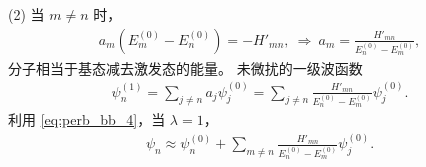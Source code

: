 (2) 当 $m \neq n$ 时，
\begin{align}
    a_m (E_m^{(0)} - E_n^{(0)}) = - H'_{mn},\ \Rightarrow \ a_m = \frac{H'_{mn}}{E_n^{(0)} - E_m^{(0)}}, 
\end{align}
分子相当于基态减去激发态的能量。
未微扰的一级波函数
\begin{align}
    \psi_n^{(1)} = \sum_{j\neq n} a_j \psi_j^{(0)} = \sum_{j\neq n} \frac{H'_{mn}}{E_n^{(0)} - E_m^{(0)}}\psi_j^{(0)}. 
\end{align}
利用 \eqref{eq:perb_bb_4}，当 $\lambda = 1$，
\begin{align}
    \psi_n \approx \psi_n^{(0)} + \sum_{m\neq n} \frac{H'_{mn}}{E_n^{(0)} - E_m^{(0)}}\psi_j^{(0)}. 
\end{align}

